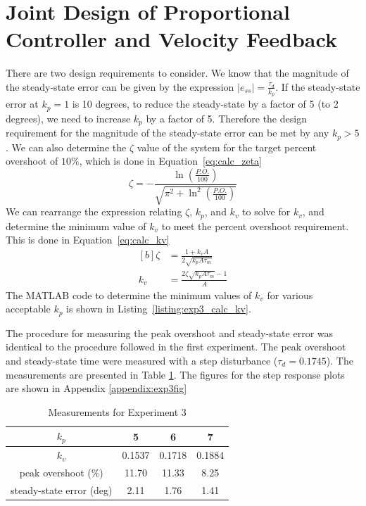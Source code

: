 \documentclass[12pt]{article}
\begin{document}
\section{Joint Design of Proportional Controller and Velocity Feedback}
There are two design requirements to consider. We know that the magnitude of the steady-state error can be given by the expression $\left| e_{ss} \right| = \frac{\tau_d}{k_p}$. If the steady-state error at $k_p = 1$ is 10 degrees, to reduce the steady-state by a factor of 5 (to 2 degrees), we need to increase $k_p$ by a factor of 5. Therefore the design requirement for the magnitude of the steady-state error can be met by any $k_p > 5$. We can also determine the $\zeta$ value of the system for the target percent overshoot of $10\%$, which is done in Equation~\ref{eq:calc_zeta}
\begin{equation} \label{eq:calc_zeta}
    \zeta = -\frac{\ln\left(\frac{P.O.}{100}\right)}{\sqrt{\pi^2 + \ln^2\left(\frac{P.O.}{100}\right)}}
\end{equation}
We can rearrange the expression relating $\zeta$, $k_p$, and $k_v$ to solve for $k_v$, and determine the minimum value of $k_v$ to meet the percent overshoot requirement. This is done in Equation~\ref{eq:calc_kv}
\begin{equation} \label{eq:calc_kv}
\begin{aligned}[b]
    \zeta &= \frac{1+k_vA}{2\sqrt{k_pA\tau_m}} \\
    k_v &= \frac{2\zeta\sqrt{k_pA\tau_m}-1}{A} 
\end{aligned}
\end{equation}
The MATLAB code to determine the minimum values of $k_v$ for various acceptable $k_p$ is shown in Listing~\ref{listing:exp3_calc_kv}.


The procedure for measuring the peak overshoot and steady-state error was identical to the procedure followed in the first experiment. The peak overshoot and steady-state time were measured with a step disturbance ($\tau_d = 0.1745$). The measurements are presented in Table \ref{table:exp3_measurements}. The figures for the step response plots are shown in Appendix \ref{appendix:exp3fig}

\begin{table}[h!]
\centering
\begin{tabular}{|c|c|c|c|} \hline
    $k_p$ & 5 & 6 & 7 \\ \hline
    $k_v$ & 0.1537 & 0.1718 & 0.1884 \\ \hline
    peak overshoot (\%) & 11.70 & 11.33 & 8.25 \\ \hline
    steady-state error (deg) & 2.11 & 1.76 & 1.41 \\ \hline
\end{tabular}
\caption{\label{table:exp3_measurements}Measurements for Experiment 3}
\end{table}
\end{document}
